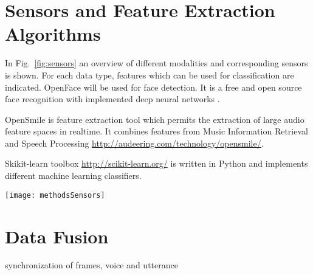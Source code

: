 \begin{comment}
\textbf{Project Oxford:} by Microsoft provides APIs for categories such as Vision, Speech, Language, Knowledge and Search. Can be tested for free.
\url{https://azure.microsoft.com/en-us/try/cognitive-services/}\\

\textbf{FaceReader:} by Noldus is widely used for academic purposes. It is a facial expression analysis software for analyzing universal emotions in addition to neutral and contempt. The software is also used to observe gaze direction and head orientation. Used more than 10,000 annotated images for training. Describes the face with 500 key points. Can be rented. 
\url{http://www.noldus.com/human-behavior-research/products/facereader}\\

\textbf{InSight} by Sightcorp is a facial expression analysis API and is also used for eye tracking, age and gender estimation, head pose estimation, etc. 2 weeks free trial.
\url{http://sightcorp.com/insight/}\\
\end{comment}




\section{Sensors and Feature Extraction Algorithms}
\label{sec:sensorsFeatures}

In Fig.~\ref{fig:sensors} an overview of different modalities and corresponding sensors is shown. For each data type, features which can be used for classification are indicated.
OpenFace will be used for face detection. It is a free and open source face recognition with implemented deep neural networks \cite{Amos2016openface}.

OpenSmile is feature extraction tool which permits the extraction of large audio feature spaces in realtime. It combines features from Music Information Retrieval and Speech Processing \url{http://audeering.com/technology/opensmile/}.

Skikit-learn toolbox \url{http://scikit-learn.org/} is written in Python and implements different machine learning classifiers.

\begin{sidewaysfigure}
\centering
\texttt{[image: methodsSensors]}
\caption{Overview of possible sensors to use and of the feature extraction algorithms. * indicates sensors available at the lab.}
\label{fig:sensors}
\end{sidewaysfigure}


\section{Data Fusion}

synchronization of frames, voice and utterance 
